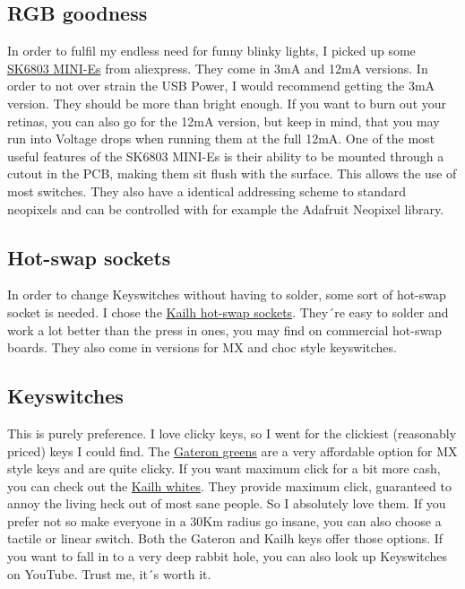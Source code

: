 \documentclass[english, 12pt]{scrartcl}
\begin{document}
	\subsection{RGB goodness}
	In order to fulfil my endless need for funny blinky lights, I picked up some \href{https://de.aliexpress.com/item/1005003636607308.html?spm=a2g0o.order_list.order_list_main.23.22bf5c5fJNwVec&gatewayAdapt=glo2deu}{SK6803 MINI-Es} from aliexpress. They come in 3mA and 12mA versions. In order to not over strain the USB Power, I would recommend getting the 3mA version. They should be more than bright enough. If you want to burn out your retinas, you can also go for the 12mA version, but keep in mind, that you may run into Voltage drops when running them at the full 12mA.\newline
	One of the most useful features of the SK6803 MINI-Es is their ability to be mounted through a cutout in the PCB, making them sit flush with the surface. This allows the use of most switches. They also have a identical addressing scheme to standard neopixels and can be controlled with for example the Adafruit Neopixel library.
	
	\subsection{Hot-swap sockets}
	In order to change Keyswitches without having to solder, some sort of hot-swap socket is needed. I chose the \href{https://keycapsss.com/keyboard-parts/parts/49/kailh-hotswap-pcb-sockets-10-pcs?c=11}{Kailh hot-swap sockets}. They´re easy to solder and work a lot better than the press in ones, you may find on commercial hot-swap boards. They also come in versions for MX and choc style keyswitches.
	
	\subsection{Keyswitches}
	This is purely preference. I love clicky keys, so I went for the clickiest (reasonably priced) keys I could find. The \href{https://de.aliexpress.com/item/32980039972.html}{Gateron greens} are a very affordable option for MX style keys and are quite clicky. If you want maximum click for a bit more cash, you can check out the \href{https://keycapsss.com/switchestester/switches/65/kailh-low-profile-choc-switches?c=9}{Kailh whites}. They provide maximum click, guaranteed to annoy the living heck out of most sane people. So I absolutely love them.\newline
	If you prefer not so make everyone in a 30Km radius go insane, you can also choose a tactile or linear switch. Both the Gateron and Kailh keys offer those options. If you want to fall in to a very deep rabbit hole, you can also look up Keyswitches on YouTube. Trust me, it´s worth it.
	
\end{document}
